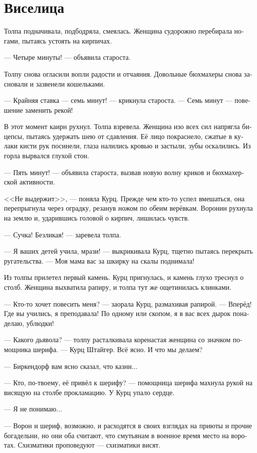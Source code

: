 \documentclass[a4paper,12pt,fleqn]{book}\usepackage{cooltooltips}\usepackage{polyglossia}\setdefaultlanguage[babelshorthands=true]{russian}\setotherlanguage{english}\defaultfontfeatures{Ligatures=TeX,Mapping=tex-text} \usepackage{xcolor}\definecolor{lightgray}{HTML}{bbbbbb}\color{lightgray}\newcommand{\ml}[3]{\textenglish{\textcolor{black}{#3}}}
\begin{document}
\section{Виселица}

Толпа подначивала, подбодряла, смеялась.
Женщина судорожно перебирала ногами, пытаясь устоять на кирпичах.

--- Четыре минуты! --- объявила староста.

Толпу снова огласили вопли радости и отчаяния.
Довольные бюхмахеры снова засновали и зазвенели кошельками.

--- Крайняя ставка --- семь минут! --- крикнула староста.
--- Семь минут --- повешение заменить рекой!

В этот момент каирн рухнул.
Толпа взревела.
Женщина изо всех сил напрягла бицепсы, пытаясь удержать шею от сдавления.
Её лицо покраснело, сжатые в кулаки кисти рук посинели, глаза налились кровью и застыли, зубы оскалились.
Из горла вырвался глухой стон.

--- Пять минут! --- объявила староста, вызвав новую волну криков и бюхмахерской активности.

<<Не выдержит>>, --- поняла Курц.
Прежде чем кто-то успел вмешаться, она перепрыгнула через оградку, резанув ножом по обеим верёвкам.
Воронин рухнула на землю и, ударившись головой о кирпич, лишилась чувств.

--- Сучка!
Безликая! --- заревела толпа.

--- Я ваших детей учила, мрази! --- выкрикивала Курц, тщетно пытаясь перекрыть ругательства.
--- Моя мама вас за шкирку на скалы поднимала!

Из толпы прилетел первый камень.
Курц пригнулась, и камень глухо треснул о столб.
Женщина выхватила рапиру, и толпа тут же ощетинилась клинками.

--- Кто-то хочет повесить меня? --- заорала Курц, размахивая рапирой.
--- Вперёд!
Где вы учились, я преподавала!
По одному или скопом, я в вас всех дырок понаделаю, ублюдки!

--- Какого дьявола? --- толпу расталкивала коренастая женщина со значком помощника шерифа.
--- Курц Штайгер.
Всё ясно.
И что мы делаем?

--- Биркендорф вам ясно сказал, что казни...

--- Кто, по-твоему, её привёл к шерифу? --- помощница шерифа махнула рукой на висящую на столбе прокламацию.
У Курц упало сердце.

--- Я не понимаю...

--- Ворон и шериф, возможно, и расходятся в своих взглядах на приюты и прочие богадельни, но они оба считают, что смутьянам в военное время место на воротах.
Схизматики проповедуют --- схизматики висят.
\end{document}
